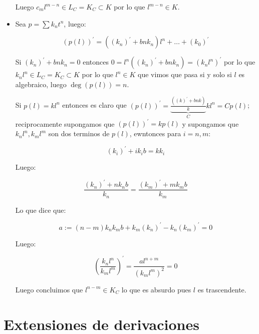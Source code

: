 \documentclass[11pt]{article}
\newcommand{\derivation}[1]{\left(#1\right)^\prime}
\newcommand{\constants}[1]{#1_C}
\numberwithin{theorem}{subsection}
\newenvironment{proof}[1][Demostraci\'on]{\begin{trivlist}
		\item[\hskip \labelsep {\bfseries #1}]}{\end{trivlist}}
\newcommand{\qed}{\nobreak \ifvmode \relax \else
	\ifdim\lastskip<1.5em \hskip-\lastskip
	\hskip1.5em plus0em minus0.5em \fi \nobreak
	\vrule height0.75em width0.5em depth0.25em\fi}
\begin{document}
\begin{proof}
\begin{itemize}
		Luego $c_m l^{m-n} \in \constants{L} = \constants{K} \subset K$ por lo que $l^{m-n} \in K$.
		
		\item Sea $p = \sum k_n t^n$, luego:
		
		\begin{equation}
			\derivation{p(l)} = \left(\derivation{k_n }+ bnk_n\right) l^n + \dots + \derivation{k_0}
		\end{equation}
		
		Si $\derivation{k_n }+ bnk_n = 0$ entonces $ 0 = l^n \left(\derivation{k_n }+ bnk_n\right) = \derivation{k_n l^n}$ por lo que $k_nl^n \in \constants{L} = \constants{K} \subset K$ por lo que $l^n \in K$ que vimos que pasa si y solo si $l$ es algebraico, luego $\deg(p(l)) = n$.
		
		Si $p(l) = kl^n$ entonces es claro que $\derivation{p(l)} = \underbrace{\frac{\left(\derivation{k} + bnk\right)}{k}}_{C}kl^n = C p(l)$; reciprocamente supongamos que $\derivation{p(l)} = k p(l)$ y supongamos que $k_n l^n, k_ml^m$ son dos terminos de $p(l)$, ewntonces para $i=n,m$:
		
		\begin{equation}
		\derivation{k_i} + ik_ib = k k_i
		\end{equation}
		
		Luego:
		
		\begin{equation}
			\dfrac{\derivation{k_n} + nk_nb}{k_n} = \dfrac{\derivation{k_m} + mk_mb}{k_m}
		\end{equation}
		
		Lo que dice que:
		
		\begin{equation}
			a := (n-m)k_nk_mb + k_m\derivation{k_n} - k_n\derivation{k_m} = 0
		\end{equation}
		
		Luego:
		
		\begin{equation}
			\derivation{\dfrac{k_nl^n}{k_ml^m}} = \dfrac{a l^{n+m}}{\left(k_m l^m\right)^2} = 0
		\end{equation}
		
		Luego concluimos que $l^{n-m} \in \constants{K}$ lo que es absurdo pues $l$ es trascendente. \qed
		
	\end{itemize}
	
\end{proof}

\section{Extensiones de derivaciones}
\end{document}
